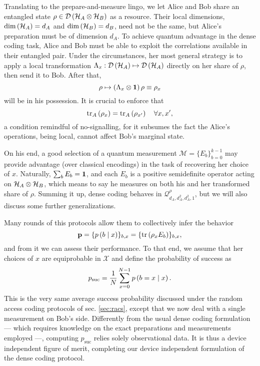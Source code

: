         Translating to the prepare-and-measure lingo, we let Alice and Bob share an entangled state $\rho \in \mathcal{D}\left( \mathcal{H}_A \otimes \mathcal{H}_B \right)$ as a resource. Their local dimensions, $\text{dim} \left( \mathcal{H}_A \right) = d_A$ and $\text{dim} \left( \mathcal{H}_B \right) = d_B$, need not be the same, but Alice's preparation must be of dimension $d_A$. To achieve quantum advantage in the dense coding task, Alice and Bob must be able to exploit the correlations available in their entangled pair. Under the circumstances, her most general strategy is to apply a local transformation $\Lambda_x : \mathcal{D}\left( \mathcal{H}_A \right) \mapsto \mathcal{D}\left( \mathcal{H}_A \right)$ directly on her share of $\rho$, then send it to Bob. After that,
        $$
            \rho \mapsto \left( \Lambda_x \otimes \mathbf{1} \right)\rho \equiv \rho_x
        $$
        will be in his possession. It is crucial to enforce that
        $$
            \text{tr}_{A}\left( \rho_x \right) = \text{tr}_{A}\left( \rho_{x^\prime} \right) \quad\forall x, x^\prime ,
        $$
        a condition remindful of no-signalling, for it subsumes the fact the Alice's operations, being local, cannot affect Bob's marginal state.
        
        On his end, a good selection of a quantum measurement $\mathcal{M} = \{ E_b \}_{b=0}^{k-1}$ may provide advantage (over classical encodings) in the task of recovering her choice of $x$. Naturally, $\sum_b E_b = \mathbf{1}$, and each $E_b$ is a positive semidefinite operator acting on $\mathcal{H}_A \otimes \mathcal{H}_B$, which means to say he measures on both his and her transformed share of $\rho$. Summing it up, dense coding behaves in $\mathcal{Q}^\rho_{d_A,d_A^2,d_A^2,1}$, but we will also discuss some further generalizations.
        
        Many rounds of this protocols allow them to collectively infer the behavior
        $$
            \mathbf{p} = \{ p \left( b \mid x \right) \}_{b,x} = \{ \text{tr}\left( \rho_x E_b  \right) \}_{b,x} ,
        $$
        and from it we can assess their performance. To that end, we assume that her choices of $x$ are equiprobable in $\mathcal{X}$ and define the probability of success as
        \begin{equation}
            p_{\text{suc}} = \frac{1}{N} \sum_{x=0}^{N-1} p \left( b=x \mid x \right) .
            \label{eq:psuc-dense-coding}
        \end{equation}
        This is the very same average success probability discussed under the random access coding protocols of sec. \ref{sec:racs}, except that we now deal with a single measurement on Bob's side. Differently from the usual dense coding formulation --- which requires knowledge on the exact preparations and measurements employed ---, computing $p_{\text{suc}}$ relies solely observational data. It is thus a device independent figure of merit, completing our device independent formulation of the dense coding protocol.
        
